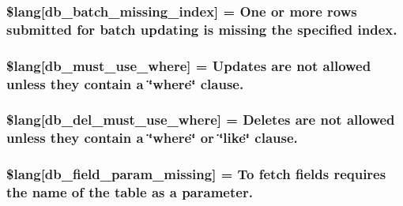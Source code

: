 \subsubsection[{\$lang}]{\setlength{\rightskip}{0pt plus 5cm}\$lang\mbox{[}\textquotesingle{}db\+\_\+batch\+\_\+missing\+\_\+index\textquotesingle{}\mbox{]} = \textquotesingle{}One or more rows submitted {\bf for} batch updating is missing the specified index.\textquotesingle{}}\label{db__lang_8php_af946769a3dd5679c60e6f2ef5f7a5aa1}
\hypertarget{db__lang_8php_add4bfc65af76fda2c48fa6a2e8d2e506}{}
\subsubsection[{\$lang}]{\setlength{\rightskip}{0pt plus 5cm}\$lang\mbox{[}\textquotesingle{}db\+\_\+must\+\_\+use\+\_\+where\textquotesingle{}\mbox{]} = \textquotesingle{}Updates are not allowed unless they contain {\bf a} \char`\"{}where\char`\"{} clause.\textquotesingle{}}\label{db__lang_8php_add4bfc65af76fda2c48fa6a2e8d2e506}
\hypertarget{db__lang_8php_a256ae2de791e589ddc23012f74f390ea}{}
\subsubsection[{\$lang}]{\setlength{\rightskip}{0pt plus 5cm}\$lang\mbox{[}\textquotesingle{}db\+\_\+del\+\_\+must\+\_\+use\+\_\+where\textquotesingle{}\mbox{]} = \textquotesingle{}Deletes are not allowed unless they contain {\bf a} \char`\"{}where\char`\"{} or \char`\"{}like\char`\"{} clause.\textquotesingle{}}\label{db__lang_8php_a256ae2de791e589ddc23012f74f390ea}
\hypertarget{db__lang_8php_a9101352a8cd8c8f34a6b8b1e30c45d8a}{}
\subsubsection[{\$lang}]{\setlength{\rightskip}{0pt plus 5cm}\$lang\mbox{[}\textquotesingle{}db\+\_\+field\+\_\+param\+\_\+missing\textquotesingle{}\mbox{]} = \textquotesingle{}To fetch fields requires the name of the table as {\bf a} parameter.\textquotesingle{}}\label{db__lang_8php_a9101352a8cd8c8f34a6b8b1e30c45d8a}
\hypertarget{db__lang_8php_a77c256be8532e23e8463481f51732116}{}
